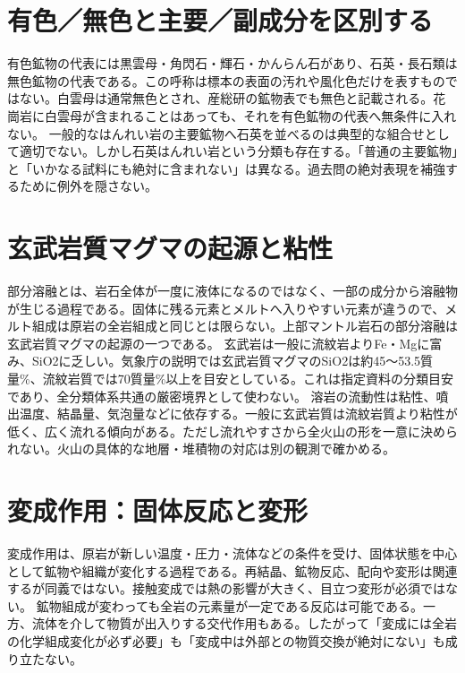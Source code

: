 \section{有色／無色と主要／副成分を区別する}
\label{theory:petrology:minerals}
有色鉱物の代表には黒雲母・角閃石・輝石・かんらん石があり、石英・長石類は無色鉱物の代表である。この呼称は標本の表面の汚れや風化色だけを表すものではない。白雲母は通常無色とされ、産総研の鉱物表でも無色と記載される\cite{aist_crystal_colors}。花崗岩に白雲母が含まれることはあっても、それを有色鉱物の代表へ無条件に入れない。
一般的なはんれい岩の主要鉱物へ石英を並べるのは典型的な組合せとして適切でない。しかし石英はんれい岩という分類も存在する\cite{usgs_rock_thesaurus}。「普通の主要鉱物」と「いかなる試料にも絶対に含まれない」は異なる。過去問の絶対表現を補強するために例外を隠さない。

\section{玄武岩質マグマの起源と粘性}
\label{theory:petrology:magma}
部分溶融とは、岩石全体が一度に液体になるのではなく、一部の成分から溶融物が生じる過程である。固体に残る元素とメルトへ入りやすい元素が違うので、メルト組成は原岩の全岩組成と同じとは限らない。上部マントル岩石の部分溶融は玄武岩質マグマの起源の一つである。
玄武岩は一般に流紋岩よりFe・Mgに富み、SiO2に乏しい。気象庁の説明では玄武岩質マグマのSiO2は約45〜53.5質量\%、流紋岩質では70質量\%以上を目安としている\cite{jma_magma1999}。これは指定資料の分類目安であり、全分類体系共通の厳密境界として使わない。
溶岩の流動性は粘性、噴出温度、結晶量、気泡量などに依存する。一般に玄武岩質は流紋岩質より粘性が低く、広く流れる傾向がある。ただし流れやすさから全火山の形を一意に決められない。火山の具体的な地層・堆積物の対応は別の観測で確かめる\cite{gsj_fuji_units}。

\section{変成作用：固体反応と変形}
\label{theory:petrology:metamorphism}
変成作用は、原岩が新しい温度・圧力・流体などの条件を受け、固体状態を中心として鉱物や組織が変化する過程である。再結晶、鉱物反応、配向や変形は関連するが同義ではない。接触変成では熱の影響が大きく、目立つ変形が必須ではない\cite{nelson_contact2011}。
鉱物組成が変わっても全岩の元素量が一定である反応は可能である。一方、流体を介して物質が出入りする交代作用もある。したがって「変成には全岩の化学組成変化が必ず必要」も「変成中は外部との物質交換が絶対にない」も成り立たない。

